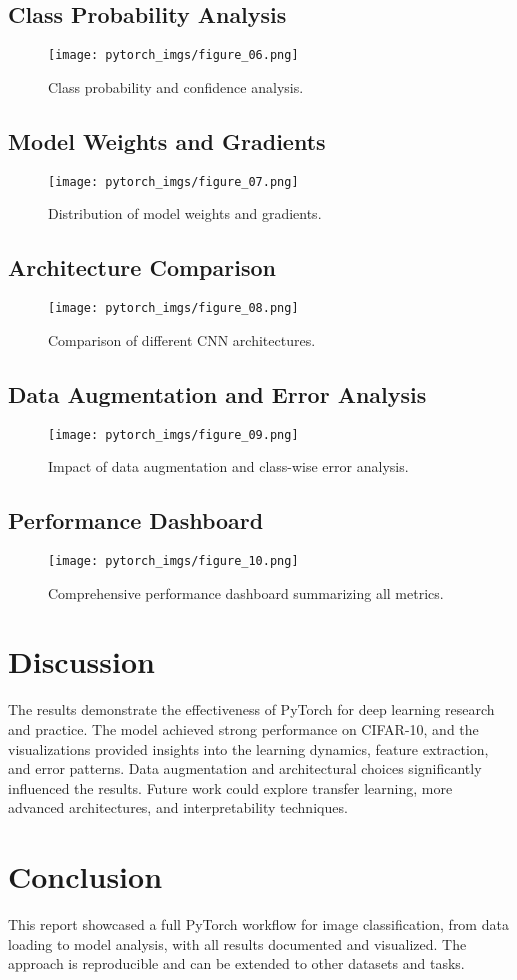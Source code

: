 \documentclass[12pt,a4paper]{article}
\begin{document}
\subsection{Class Probability Analysis}
\begin{figure}[H]
    \centering
    \texttt{[image: pytorch\_imgs/figure\_06.png]}
    \caption{Class probability and confidence analysis.}
\end{figure}

\subsection{Model Weights and Gradients}
\begin{figure}[H]
    \centering
    \texttt{[image: pytorch\_imgs/figure\_07.png]}
    \caption{Distribution of model weights and gradients.}
\end{figure}

\subsection{Architecture Comparison}
\begin{figure}[H]
    \centering
    \texttt{[image: pytorch\_imgs/figure\_08.png]}
    \caption{Comparison of different CNN architectures.}
\end{figure}

\subsection{Data Augmentation and Error Analysis}
\begin{figure}[H]
    \centering
    \texttt{[image: pytorch\_imgs/figure\_09.png]}
    \caption{Impact of data augmentation and class-wise error analysis.}
\end{figure}

\subsection{Performance Dashboard}
\begin{figure}[H]
    \centering
    \texttt{[image: pytorch\_imgs/figure\_10.png]}
    \caption{Comprehensive performance dashboard summarizing all metrics.}
\end{figure}

\section{Discussion}
The results demonstrate the effectiveness of PyTorch for deep learning research and practice. The model achieved strong performance on CIFAR-10, and the visualizations provided insights into the learning dynamics, feature extraction, and error patterns. Data augmentation and architectural choices significantly influenced the results. Future work could explore transfer learning, more advanced architectures, and interpretability techniques.

\section{Conclusion}
This report showcased a full PyTorch workflow for image classification, from data loading to model analysis, with all results documented and visualized. The approach is reproducible and can be extended to other datasets and tasks.
\end{document}
